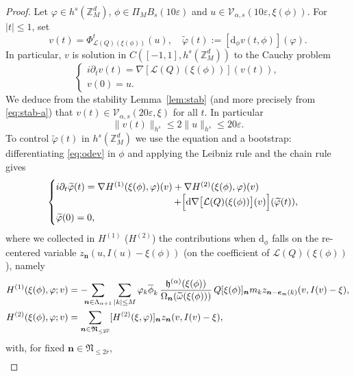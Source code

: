 \documentclass[JEP,XML,SOM,Unicode,published]{cedram}
\theoremstyle{plain}
\theoremstyle{definition}
\newcommand{\nb}{{\boldsymbol n}}
\newcommand{\Nb}{{\boldsymbol{\mathfrak{N}}}}
\newcommand{\Z}{\mathbb{Z}}
\newcommand{\1}{\mathbf{1}}
\let\epsilon\varepsilon
\begin{document}
\begin{proof}
Let $\varphi\in h^{s}(\Z_{M}^{d})$, $\phi\in\Pi_{M}B_{s}(10\epsilon)$ and $u\in\mathcal{V}_{\alpha,s}(10\epsilon,\xi(\phi))$. For $|t|\leq 1$, set
\[
v(t) = \Phi^{t}_{\mathcal{L}(Q)(\xi(\phi))}(u),\quad \widetilde{\varphi}(t) := [\mathrm{d}_{\phi}v(t,\phi)](\varphi).
\]
In particular, $v$ is solution in $C([-1,1],h^{s}(\Z_{M}^{d}))$ to the Cauchy problem
\[
\begin{cases}
i\partial_{t}v(t) = \nabla [\mathcal{L}(Q)(\xi(\phi))](v(t)),\\
v(0)=u.
\end{cases}
\]
We deduce from the stability Lemma~\ref{lem:stab} (and more precisely from \eqref{eq:stab-a}) that $v(t)\in\mathcal{V}_{\alpha,s}(20\epsilon,\xi)$ for all $t$. In particular
\[
\|v(t)\|_{h^{s}}\leq 2\|u\|_{h^{s}}\leq20\epsilon.
\]
To control $\widetilde{\varphi}(t)$ in $h^{s}(\Z_{M}^{d})$ we use the equation and a bootstrap: differentiating \eqref{eq:odev} in $\phi$ and applying the Leibniz rule and the chain rule gives
\begin{equation}
\label{eq:dim}
\begin{cases}
i\partial_{t}\widetilde{\varphi}(t)
= \nabla H^{(1)}(\xi(\phi),\varphi)(v) + \nabla H^{(2)}(\xi(\phi),\varphi)(v)\\
\hspace*{4.35cm}+ \Big[\mathrm{d}\nabla\big[\mathcal{L}(Q)(\xi(\phi))\big](v)\Big](\widetilde{\varphi}(t)),\\
\widetilde{\varphi}(0)=0,
\end{cases}
\end{equation}
where we collected in $H^{(1)}$ (\resp $H^{(2)}$) the contributions when $\mathrm{d}_{\phi}$ falls on the re-centered variable $z_{\nb}(u,I(u)-\xi(\phi))$ (\resp on the coefficient of $\mathcal{L}(Q)(\xi(\phi))$), namely
\begin{align*}
H^{(1)}(\xi(\phi),\varphi;v)
&= -\hspace*{-2mm}\sum_{\nb\in\Lambda_{\alpha+1}}\sum_{|k|\leq M}\varphi_{k}\overline{\phi}_{k}\,
\frac{\mathfrak{h}^{(\alpha)}(\xi(\phi))}{\Omega_{\nb}(\widetilde{\omega}(\xi(\phi)))}\,
Q[\xi(\phi)]_{\nb}
m_{k}z_{\nb-\boldsymbol{e}_{\mathfrak{m}}(k)}(v,I(v)-\xi),\\
H^{(2)}(\xi(\phi),\varphi ; v)
&= \sum_{\nb\in\Nb_{\leq2\overline{r}}}
[H^{(2)}(\xi,\varphi)]_{\nb}z_{\nb}(v,I(v)-\xi),
\end{align*}
with, for fixed $\nb\in\Nb_{\leq2\overline{r}}$,
\begin{equation*}
\begin{split}

\end{split}
\end{equation*}
\end{proof}
\end{document}
